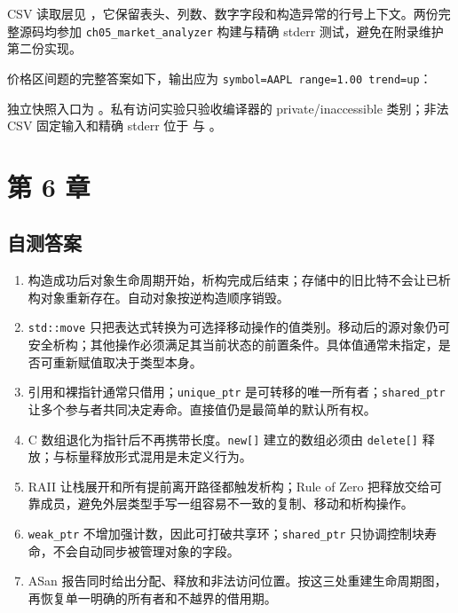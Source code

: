 CSV 读取层见 ，它保留表头、列数、数字字段和构造异常的行号上下文。两份完整源码均参加 \texttt{ch05\_market\_analyzer} 构建与精确 stderr 测试，避免在附录维护第二份实现。

价格区间题的完整答案如下，输出应为 \texttt{symbol=AAPL range=1.00 trend=up}：


独立快照入口为 。私有访问实验只验收编译器的 private/inaccessible 类别；非法 CSV 固定输入和精确 stderr 位于  与 。

\section{第 6 章}
\subsection*{自测答案}
\begin{enumerate}
  \item 构造成功后对象生命周期开始，析构完成后结束；存储中的旧比特不会让已析构对象重新存在。自动对象按逆构造顺序销毁。
  \item \texttt{std::move} 只把表达式转换为可选择移动操作的值类别。移动后的源对象仍可安全析构；其他操作必须满足其当前状态的前置条件。具体值通常未指定，是否可重新赋值取决于类型本身。
  \item 引用和裸指针通常只借用；\texttt{unique\_ptr} 是可转移的唯一所有者；\texttt{shared\_ptr} 让多个参与者共同决定寿命。直接值仍是最简单的默认所有权。
  \item C 数组退化为指针后不再携带长度。\texttt{new[]} 建立的数组必须由 \texttt{delete[]} 释放；与标量释放形式混用是未定义行为。
  \item RAII 让栈展开和所有提前离开路径都触发析构；Rule of Zero 把释放交给可靠成员，避免外层类型手写一组容易不一致的复制、移动和析构操作。
  \item \texttt{weak\_ptr} 不增加强计数，因此可打破共享环；\texttt{shared\_ptr} 只协调控制块寿命，不会自动同步被管理对象的字段。
  \item ASan 报告同时给出分配、释放和非法访问位置。按这三处重建生命周期图，再恢复单一明确的所有者和不越界的借用期。
\end{enumerate}

